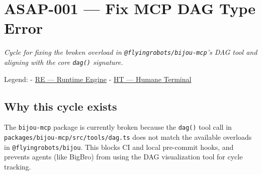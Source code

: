\chapter{ASAP-001 --- Fix MCP DAG Type Error}\label{record-251}

\smallskip

\emph{Cycle for fixing the broken overload in \texttt{@\allowbreak{}f\allowbreak{}l\allowbreak{}y\allowbreak{}i\allowbreak{}n\allowbreak{}g\allowbreak{}r\allowbreak{}o\allowbreak{}b\allowbreak{}o\allowbreak{}t\allowbreak{}s\allowbreak{}/\allowbreak{}b\allowbreak{}i\allowbreak{}j\allowbreak{}o\allowbreak{}u\allowbreak{}-\allowbreak{}m\allowbreak{}c\allowbreak{}p}'s DAG tool and aligning with the core \texttt{d\allowbreak{}a\allowbreak{}g\allowbreak{}(\allowbreak{})} signature.}

Legend: - \href{https://github.com/flyingrobots/bijou/blob/cbd70612140e7a450d764b3c7be1c6af878b99bc/legends/RE-runtime-engine.md}{RE --- Runtime Engine} - \href{https://github.com/flyingrobots/bijou/blob/cbd70612140e7a450d764b3c7be1c6af878b99bc/legends/HT-humane-terminal.md}{HT --- Humane Terminal}

\section{Why this cycle exists}\label{record-251-why-this-cycle-exists}

The \texttt{b\allowbreak{}i\allowbreak{}j\allowbreak{}o\allowbreak{}u\allowbreak{}-\allowbreak{}m\allowbreak{}c\allowbreak{}p} package is currently broken because the \texttt{d\allowbreak{}a\allowbreak{}g\allowbreak{}(\allowbreak{})} tool call in \texttt{p\allowbreak{}a\allowbreak{}c\allowbreak{}k\allowbreak{}a\allowbreak{}g\allowbreak{}e\allowbreak{}s\allowbreak{}/\allowbreak{}b\allowbreak{}i\allowbreak{}j\allowbreak{}o\allowbreak{}u\allowbreak{}-\allowbreak{}m\allowbreak{}c\allowbreak{}p\allowbreak{}/\allowbreak{}s\allowbreak{}r\allowbreak{}c\allowbreak{}/\allowbreak{}t\allowbreak{}o\allowbreak{}o\allowbreak{}l\allowbreak{}s\allowbreak{}/\allowbreak{}d\allowbreak{}a\allowbreak{}g\allowbreak{}.\allowbreak{}t\allowbreak{}s} does not match the available overloads in \texttt{@\allowbreak{}f\allowbreak{}l\allowbreak{}y\allowbreak{}i\allowbreak{}n\allowbreak{}g\allowbreak{}r\allowbreak{}o\allowbreak{}b\allowbreak{}o\allowbreak{}t\allowbreak{}s\allowbreak{}/\allowbreak{}b\allowbreak{}i\allowbreak{}j\allowbreak{}o\allowbreak{}u}. This blocks CI and local pre-commit hooks, and prevents agents (like BigBro) from using the DAG visualization tool for cycle tracking.

